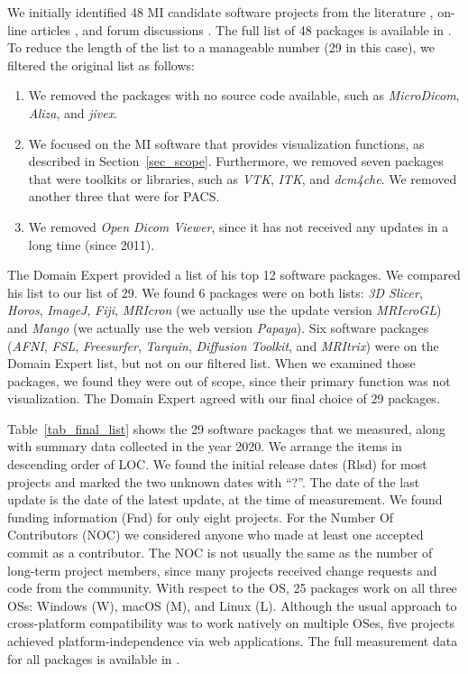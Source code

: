 \documentclass[11pt]{article}
\begin{document}
We initially identified 48 MI candidate software projects from the literature
\citep{Bjorn2017, Bruhschwein2019, Haak2015}, on-line articles \citep{Emms2019,
Hasan2020, Mu2019}, and forum discussions \citep{Samala2014}.  The full list of
48 packages is available in \citet{Dong2021}.  To reduce the length of the list
to a manageable number (29 in this case), we filtered the original list as
follows:

\begin{enumerate}

\item We removed the packages with no source code available, such as
\textit{MicroDicom}, \textit{Aliza}, and \textit{jivex}.

\item We focused on the MI software that provides visualization functions, as
described in Section~\ref{sec_scope}. Furthermore, we removed seven packages
that were toolkits or libraries, such as \textit{VTK}, \textit{ITK}, and
\textit{dcm4che}.  We removed another three that were for PACS.

\item We removed \textit{Open Dicom Viewer}, since it has not received any
updates in a long time (since 2011).

\end{enumerate}

The Domain Expert provided a list of his top 12 software packages.  We compared
his list to our list of 29.  We found 6 packages were on both lists: \textit{3D
Slicer}, \textit{Horos}, \textit{ImageJ}, \textit{Fiji}, \textit{MRIcron} (we
actually use the update version \textit{MRIcroGL}) and \textit{Mango} (we
actually use the web version \textit{Papaya}).  Six software packages
(\textit{AFNI}, \textit{FSL}, \textit{Freesurfer}, \textit{Tarquin},
\textit{Diffusion Toolkit}, and \textit{MRItrix}) were on the Domain Expert
list, but not on our filtered list.  When we examined those packages,
we found they were out of scope, since their primary function was not
visualization.  The Domain Expert agreed with our final choice of 29 packages.

Table~\ref{tab_final_list} shows the 29 software packages that we measured,
along with summary data collected in the year 2020. We arrange the items in
descending order of LOC. We found the initial release dates (Rlsd) for most
projects and marked the two unknown dates with ``?''. The date of the last
update is the date of the latest update, at the time of measurement. We found
funding information (Fnd) for only eight projects.  For the Number Of
Contributors (NOC) we considered anyone who made at least one accepted commit as
a contributor. The NOC is not usually the same as the number of long-term
project members, since many projects received change requests and code from the
community.  With respect to the OS, 25 packages work on all three OSs: Windows
(W), macOS (M), and Linux (L). Although the usual approach to cross-platform
compatibility was to work natively on multiple OSes, five projects achieved
platform-independence via web applications. The full measurement data for all
packages is available in \citet{Dong2021-Data}.
\end{document}
